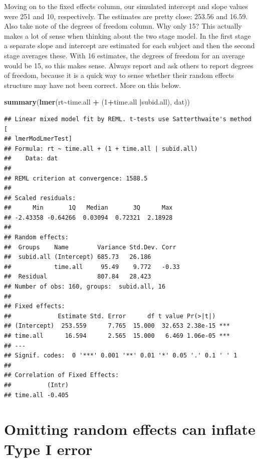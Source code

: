 \documentclass[
]{book}
\newenvironment{Shaded}{\begin{snugshade}}{\end{snugshade}}
\newcommand{\DecValTok}[1]{\textcolor[rgb]{0.00,0.00,0.81}{#1}}
\newcommand{\KeywordTok}[1]{\textcolor[rgb]{0.13,0.29,0.53}{\textbf{#1}}}
\newcommand{\NormalTok}[1]{#1}
\newcommand{\OperatorTok}[1]{\textcolor[rgb]{0.81,0.36,0.00}{\textbf{#1}}}
\newcommand{\StringTok}[1]{\textcolor[rgb]{0.31,0.60,0.02}{#1}}
\begin{document}
Moving on to the fixed effects column, our simulated intercept and slope values were 251 and 10, respectively. The estimates are pretty close: 253.56 and 16.59. Also take note of the degrees of freedom column. Why only 15? This actually makes a lot of sense when thinking about the two stage model. In the first stage a separate slope and intercept are estimated for each subject and then the second stage averages these. With 16 estimates, the degrees of freedom for an average would be 15, so this makes sense. Always report and ask others to report degrees of freedom, because it is a quick way to sense whether their random effects structure may have not been correct. More on this below.

\begin{Shaded}
\begin{Highlighting}[]
\KeywordTok{summary}\NormalTok{(}\KeywordTok{lmer}\NormalTok{(rt}\OperatorTok{\textasciitilde{}}\NormalTok{time.all }\OperatorTok{+}\StringTok{ }\NormalTok{(}\DecValTok{1}\OperatorTok{+}\NormalTok{time.all }\OperatorTok{|}\NormalTok{subid.all), dat))}
\end{Highlighting}
\end{Shaded}

\begin{verbatim}
## Linear mixed model fit by REML. t-tests use Satterthwaite's method [
## lmerModLmerTest]
## Formula: rt ~ time.all + (1 + time.all | subid.all)
##    Data: dat
## 
## REML criterion at convergence: 1588.5
## 
## Scaled residuals: 
##      Min       1Q   Median       3Q      Max 
## -2.43358 -0.64266  0.03094  0.72321  2.18928 
## 
## Random effects:
##  Groups    Name        Variance Std.Dev. Corr 
##  subid.all (Intercept) 685.73   26.186        
##            time.all     95.49    9.772   -0.33
##  Residual              807.84   28.423        
## Number of obs: 160, groups:  subid.all, 16
## 
## Fixed effects:
##             Estimate Std. Error      df t value Pr(>|t|)    
## (Intercept)  253.559      7.765  15.000  32.653 2.38e-15 ***
## time.all      16.594      2.565  15.000   6.469 1.06e-05 ***
## ---
## Signif. codes:  0 '***' 0.001 '**' 0.01 '*' 0.05 '.' 0.1 ' ' 1
## 
## Correlation of Fixed Effects:
##          (Intr)
## time.all -0.405
\end{verbatim}

\hypertarget{omitting-random-effects-can-inflate-type-i-error}{%
\section*{Omitting random effects can inflate Type I error}\label{omitting-random-effects-can-inflate-type-i-error}}
\end{document}
